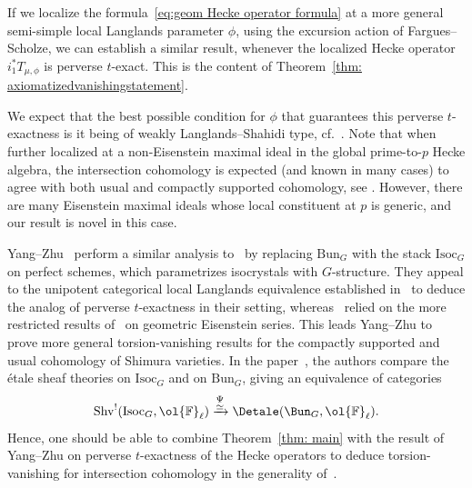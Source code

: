 \documentclass[letterpaper,11pt]{amsart}
\begin{document}
\begin{remark}{\label{rem: EisensteinvsLSType}} If we localize the formula~\eqref{eq:geom Hecke operator formula} at a more general semi-simple local Langlands parameter $\phi$, using the excursion action of Fargues--Scholze, we can establish a similar result, whenever the localized Hecke operator $i_{1}^{*}T_{\mu,\phi}$ is perverse $t$-exact. This is the content of Theorem~\ref{thm: axiomatizedvanishingstatement}.

We expect that the best possible condition for $\phi$ that guarantees this perverse $t$-exactness is it being of weakly Langlands--Shahidi type, cf.~\cite[Definition~6.2, Conjecture 6.4]{HamannLeeTorsion}. Note that when further localized at a non-Eisenstein maximal ideal in the global prime-to-$p$ Hecke algebra, the intersection cohomology is expected (and known in many cases) to agree with both usual and compactly supported cohomology, see \cite[Remark 1.6]{CS2}. However, there are many Eisenstein maximal ideals whose local constituent at $p$ is generic, and our result is novel in this case.
\end{remark}


\begin{remark} Yang--Zhu~\cite{YangZhuTorsion} perform a similar analysis to~\cite{HamannLeeTorsion} by replacing $\mathrm{Bun}_G$ with the stack $\mathrm{Isoc}_G$ on perfect schemes, which parametrizes isocrystals with $G$-structure. They appeal to the unipotent categorical local Langlands equivalence established in~\cite{Zhu} to deduce the analog of perverse $t$-exactness in their setting, whereas~\cite{HamannLeeTorsion} relied on the more restricted results of~\cite{HamGeomES} on geometric Eisenstein series. This leads Yang--Zhu to prove more general torsion-vanishing results for the compactly supported and usual cohomology of Shimura varieties. In the paper~\cite{GHILZIsocComparison}, the authors compare the \'etale sheaf theories on $\mathrm{Isoc}_G$ and on $\mathrm{Bun}_G$, giving an equivalence of categories
\[
\mathrm{Shv}^{!}(\mathrm{Isoc}_{G},\ol{\mathbb{F}}_{\ell}) \xrightarrow{\substack{\Psi \\ \simeq}} \Detale(\Bun_{G},\ol{\mathbb{F}}_{\ell}).
\] 
Hence, one should be able to combine Theorem~\ref{thm: main} with the result of Yang--Zhu on perverse $t$-exactness of the Hecke operators to deduce torsion-vanishing for intersection cohomology in the generality of~\cite{YangZhuTorsion}.
\end{remark}
\end{document}
